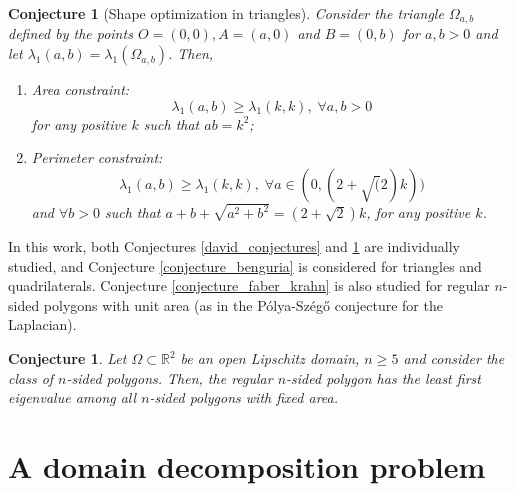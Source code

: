 \documentclass[5p,authoryear]{elsarticle}
\newtheorem{conjecture}[theorem]{Conjecture}
\begin{document}
\begin{conjecture}[Shape optimization in triangles]\label{triangle_conjectures}
    Consider the triangle \(\Omega_{a, b}\) defined by the points \(O=(0, 0), A=(a, 0)\) and \(B=(0, b)\) for \(a, b>0\) and let \(\lambda_1(a, b) = \lambda_1(\Omega_{a, b})\). Then,
    \begin{enumerate}
        \item \textit{Area constraint: } \[\lambda_1(a, b) \geq \lambda_1(k, k),\; \forall a, b>0\] for any positive \(k\) such that \(ab=k^2\);
        \item \textit{Perimeter constraint: } \[\lambda_1(a, b) \geq \lambda_1(k, k),\; \forall a \in (0, (2+\sqrt(2)k))\] and \(\forall b > 0\) such that \(a+b+\sqrt{a^2+b^2}=(2+\sqrt{2})k\), for any positive \(k\).
    \end{enumerate}
\end{conjecture}
In this work, both Conjectures \ref{david_conjectures} and \ref{triangle_conjectures} are individually studied, and Conjecture \ref{conjecture_benguria} is considered for triangles and quadrilaterals. Conjecture \ref{conjecture_faber_krahn} is also studied for regular \(n\)-sided polygons with unit area (as in the Pólya-Szég\H{o} conjecture for the Laplacian).
\begin{conjecture}\label{polya_szego_conjecture_dirac}
    Let \(\Omega \subset \mathbb{R}^2\) be an open Lipschitz domain, \(n \geq 5\) and consider the class of \(n\)-sided polygons. Then, the regular \(n\)-sided polygon has the least first eigenvalue among all \(n\)-sided polygons with fixed area.
\end{conjecture}

\section{A domain decomposition problem}
\end{document}
